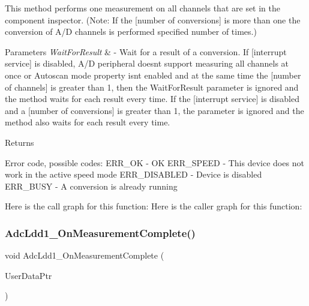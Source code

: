 This method performs one measurement on all channels that are set in the component inspector. (Note\+: If the \mbox{[}number of conversions\mbox{]} is more than one the conversion of A/D channels is performed specified number of times.) 


\begin{DoxyParams}{Parameters}
{\em Wait\+For\+Result} & -\/ Wait for a result of a conversion. If \mbox{[}interrupt service\mbox{]} is disabled, A/D peripheral doesn\textquotesingle{}t support measuring all channels at once or Autoscan mode property isn\textquotesingle{}t enabled and at the same time the \mbox{[}number of channels\mbox{]} is greater than 1, then the Wait\+For\+Result parameter is ignored and the method waits for each result every time. If the \mbox{[}interrupt service\mbox{]} is disabled and a \mbox{[}number of conversions\mbox{]} is greater than 1, the parameter is ignored and the method also waits for each result every time. \\
\hline
\end{DoxyParams}
\begin{DoxyReturn}{Returns}

\begin{DoxyItemize}
\item Error code, possible codes\+: E\+R\+R\+\_\+\+OK -\/ OK E\+R\+R\+\_\+\+S\+P\+E\+ED -\/ This device does not work in the active speed mode E\+R\+R\+\_\+\+D\+I\+S\+A\+B\+L\+ED -\/ Device is disabled E\+R\+R\+\_\+\+B\+U\+SY -\/ A conversion is already running 
\end{DoxyItemize}
\end{DoxyReturn}
Here is the call graph for this function\+:
Here is the caller graph for this function\+:
\mbox{\label{group___a_d1__module_ga4776d32af94d7918f74bc7377ae5351f}} 
\subsubsection{\texorpdfstring{Adc\+Ldd1\+\_\+\+On\+Measurement\+Complete()}{AdcLdd1\_OnMeasurementComplete()}}
{\footnotesize\ttfamily void Adc\+Ldd1\+\_\+\+On\+Measurement\+Complete (\begin{DoxyParamCaption}\item[{\hyperlink{group___p_e___types__module_ga0b66a73f87238a782318aa0be7578e35}{L\+D\+D\+\_\+\+T\+User\+Data} $\ast$}]{User\+Data\+Ptr }\end{DoxyParamCaption})}

